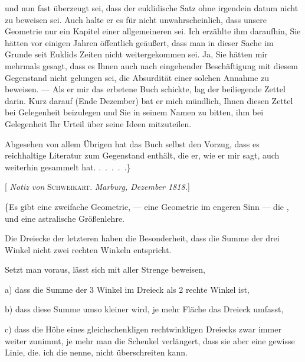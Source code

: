und nun fast überzeugt sei, dass der euklidische Satz ohne irgendein datum nicht zu beweisen sei. Auch halte er es für nicht unwahrscheinlich, dass unsere Geometrie nur ein Kapitel einer allgemeineren sei. Ich erzählte ihm daraufhin, Sie hätten vor einigen Jahren öffentlich geäußert, dass man in dieser Sache im Grunde seit Euklids Zeiten nicht weitergekommen sei. Ja, Sie hätten mir mehrmals gesagt, dass es Ihnen auch nach eingehender Beschäftigung mit diesem Gegenstand nicht gelungen sei, die Absurdität einer solchen Annahme zu beweisen. --- Als er mir das erbetene Buch schickte, lag der beiliegende Zettel darin. Kurz darauf (Ende Dezember) bat er mich mündlich, Ihnen diesen Zettel bei Gelegenheit beizulegen und Sie in seinem Namen zu bitten, ihm bei Gelegenheit Ihr Urteil über seine Ideen mitzuteilen.

Abgesehen von allem Übrigen hat das Buch selbst den Vorzug, dass es reichhaltige Literatur zum Gegenstand enthält, die er, wie er mir sagt, auch weiterhin gesammelt hat. .\ .\ .\ .\ .\}

\bigskip
\noindent\hrulefill
\bigskip

\begin{center}[\emph{ Notiz von} \textsc{Schweikart}. \emph{Marburg, Dezember 1818.}]\end{center}

\{Es gibt eine zweifache Geometrie, --- eine Geometrie im engeren Sinn --- die , und eine astralische Größenlehre.

Die Dreiecke der letzteren haben die Besonderheit, dass die Summe der drei Winkel nicht zwei rechten Winkeln entspricht.

Setzt man  voraus, lässt sich mit aller Strenge beweisen,

a) dass die Summe der 3 Winkel im Dreieck  als 2 rechte Winkel ist,

b) dass diese Summe umso kleiner wird, je mehr Fläche das Dreieck umfasst,

c) dass die Höhe eines gleichschenkligen rechtwinkligen Dreiecks zwar immer weiter zunimmt, je mehr man die Schenkel verlängert, dass sie aber eine gewisse Linie, die. ich die  nenne, nicht überschreiten kann.

